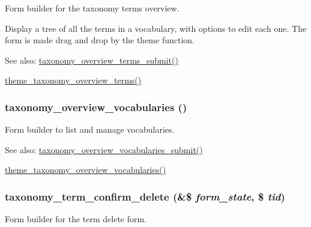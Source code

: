 Form builder for the taxonomy terms overview.

Display a tree of all the terms in a vocabulary, with options to edit each one. The form is made drag and drop by the theme function.

\begin{Desc}
\item[See also:]\hyperlink{taxonomy_8admin_8inc_fb672457712a0a215cdeaa91748b4517}{taxonomy\_\-overview\_\-terms\_\-submit()} 

\hyperlink{group__themeable_ga6eed299548007f120519d1e353b811f}{theme\_\-taxonomy\_\-overview\_\-terms()} \end{Desc}
\hypertarget{group__forms_g1540d991eabc53c2c1af6629455035ff}{
\subsubsection[{taxonomy\_\-overview\_\-vocabularies}]{\setlength{\rightskip}{0pt plus 5cm}taxonomy\_\-overview\_\-vocabularies ()}}
\label{group__forms_g1540d991eabc53c2c1af6629455035ff}


Form builder to list and manage vocabularies.

\begin{Desc}
\item[See also:]\hyperlink{taxonomy_8admin_8inc_2c0c58c11c7f85fa38bab165004f98e2}{taxonomy\_\-overview\_\-vocabularies\_\-submit()} 

\hyperlink{group__themeable_gc13e7fb950bcb43c38a2bf373d5ea348}{theme\_\-taxonomy\_\-overview\_\-vocabularies()} \end{Desc}
\hypertarget{group__forms_g409c50f3f4727ec2856079e7abb01eba}{
\subsubsection[{taxonomy\_\-term\_\-confirm\_\-delete}]{\setlength{\rightskip}{0pt plus 5cm}taxonomy\_\-term\_\-confirm\_\-delete (\&\$ {\em form\_\-state}, \/  \$ {\em tid})}}
\label{group__forms_g409c50f3f4727ec2856079e7abb01eba}


Form builder for the term delete form.

